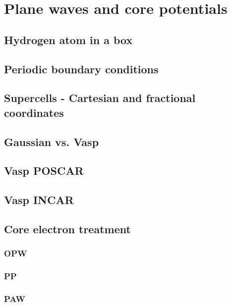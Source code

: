 \documentclass[11pt]{article}
\begin{document}
\section{Plane waves and core potentials}
\label{sec:orge458209}

\subsection{Hydrogen atom in a box}
\label{sec:orge08a262}

\subsection{Periodic boundary conditions}
\label{sec:org992fd4c}

\subsection{Supercells - Cartesian and fractional coordinates}
\label{sec:orge914c51}

\subsection{Gaussian vs. Vasp}
\label{sec:org57ec425}

\subsection{Vasp POSCAR}
\label{sec:orge94d6d6}

\subsection{Vasp INCAR}
\label{sec:org2696808}

\subsection{Core electron treatment}
\label{sec:org2ea0d83}

\subsubsection{OPW}
\label{sec:orge742d2e}

\subsubsection{PP}
\label{sec:org413d895}

\subsubsection{PAW}
\label{sec:orgf414304}
\end{document}
